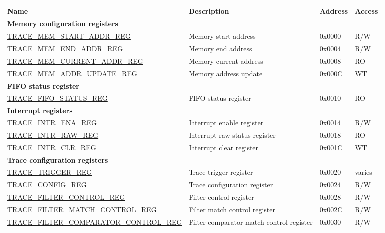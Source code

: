 \begin{longtable}{ | p{8cm} | p{6.2cm} | p{1.3cm} | p{1cm} | }
\hline\rowcolor{lightgray}
\textbf{Name} & \textbf{Description} &  \textbf{Address} & \textbf{Access} \\ \hline
\endhead
\multicolumn{4}{|l|}{\textbf{Memory configuration registers}} \\ \hline
\hyperref[regdesc:TRACEMEMSTARTADDRREG]{TRACE\_MEM\_START\_ADDR\_REG} & Memory start address & 0x0000 & R/W \\ \hline
\hyperref[regdesc:TRACEMEMENDADDRREG]{TRACE\_MEM\_END\_ADDR\_REG} & Memory end address & 0x0004 & R/W \\ \hline
\hyperref[regdesc:TRACEMEMCURRENTADDRREG]{TRACE\_MEM\_CURRENT\_ADDR\_REG} & Memory current address & 0x0008 & RO \\ \hline
\hyperref[regdesc:TRACEMEMADDRUPDATEREG]{TRACE\_MEM\_ADDR\_UPDATE\_REG} & Memory address update & 0x000C & WT \\ \hline
\multicolumn{4}{|l|}{\textbf{FIFO status register}} \\ \hline
\hyperref[regdesc:TRACEFIFOSTATUSREG]{TRACE\_FIFO\_STATUS\_REG} & FIFO status register & 0x0010 & RO \\ \hline
\multicolumn{4}{|l|}{\textbf{Interrupt registers}} \\ \hline
\hyperref[regdesc:TRACEINTRENAREG]{TRACE\_INTR\_ENA\_REG} & Interrupt enable register & 0x0014 & R/W \\ \hline
\hyperref[regdesc:TRACEINTRRAWREG]{TRACE\_INTR\_RAW\_REG} & Interrupt raw status register & 0x0018 & RO \\ \hline
\hyperref[regdesc:TRACEINTRCLRREG]{TRACE\_INTR\_CLR\_REG} & Interrupt clear register & 0x001C & WT \\ \hline
\multicolumn{4}{|l|}{\textbf{Trace configuration registers}} \\ \hline
\hyperref[regdesc:TRACETRIGGERREG]{TRACE\_TRIGGER\_REG} & Trace trigger register & 0x0020 & varies \\ \hline
\hyperref[regdesc:TRACECONFIGREG]{TRACE\_CONFIG\_REG} & Trace configuration register & 0x0024 & R/W \\ \hline
\hyperref[regdesc:TRACEFILTERCONTROLREG]{TRACE\_FILTER\_CONTROL\_REG} & Filter control register & 0x0028 & R/W \\ \hline
\hyperref[regdesc:TRACEFILTERMATCHCONTROLREG]{TRACE\_FILTER\_MATCH\_CONTROL\_REG} & Filter match control register & 0x002C & R/W \\ \hline
\hyperref[regdesc:TRACEFILTERCOMPARATORCONTROLREG]{TRACE\_FILTER\_COMPARATOR\_CONTROL\_REG} & Filter comparator match control register & 0x0030 & R/W \\ \hline

\end{longtable}
